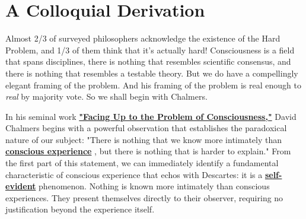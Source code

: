 \documentclass[runningheads]{llncs}
\newcommand{\link}[2]{%
\href{#1}{\textcolor{wikiblue}{#2}\xspace}%
}
\newcommand{\repo}[2]{%
\link{https://github.com/DNA-Platform/inexplicable-phenomena/blob/main/#1}{#2}\xspace%
}
\newcommand{\HardProblem}[1]{%
\link{http://consc.net/papers/facing.pdf}{#1}%
}
\newcommand{\consciousExperience}[0]{%
\repo{research/consciousness/a-novel-perspective-on-vision.md}{conscious experience}%
}
\newcommand{\selfEvident}[0]{%
\repo{research/consciousness/a-novel-perspective-on-vision.md}{self-evident}%
}
\begin{document}
\section{A Colloquial Derivation}

Almost 2/3 of surveyed philosophers acknowledge the existence of the Hard Problem, and 1/3 of them think that it's actually hard! \cite{BourgetChalmers2023} Consciousness is a field that spans disciplines, there is nothing that resembles scientific consensus, and there is nothing that resembles a testable theory. But we do have a compellingly elegant framing of the problem. And his framing of the problem is real enough to \emph{real} by majority vote. So we shall begin with Chalmers.

In his seminal work \textbf{\HardProblem{"Facing Up to the Problem of Consciousness,"}} David Chalmers begins with a powerful observation that establishes the paradoxical nature of our subject: "There is nothing that we know more intimately than \textbf{\consciousExperience}, but there is nothing that is harder to explain." From the first part of this statement, we can immediately identify a fundamental characteristic of conscious experience that echos with Descartes: it is a \textbf{\selfEvident} phenomenon. Nothing is known more intimately than conscious experiences. They present themselves directly to their observer, requiring no justification beyond the experience itself.
\end{document}
